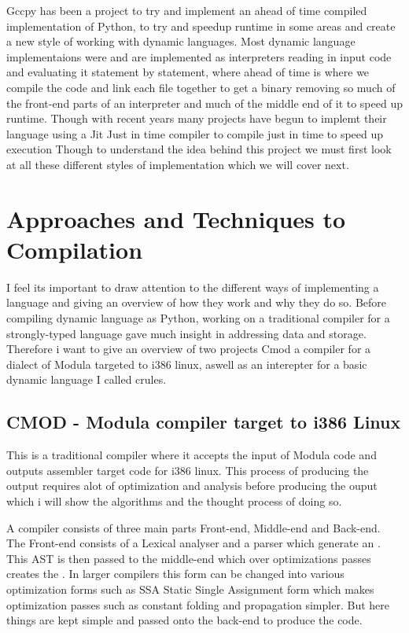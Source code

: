 \documentclass[defaultstyle,11pt]{article}
\begin{document}
Gccpy has been a project to try and implement an ahead of time compiled implementation of Python, to try and
speedup runtime in some areas and create a new style of working with dynamic languages. Most dynamic language implementaions
were and are implemented as interpreters reading in input code and evaluating it statement by statement, where ahead of time
is where we compile the code and link each file together to get a binary removing so much of the front-end parts of an interpreter
and much of the middle end of it to speed up runtime. Though with recent years many projects have begun to implemt their language
using a Jit Just in time compiler to compile just in time to speed up execution Though to understand the idea behind this project
we must first look at all these different styles of implementation which we will cover next.


\section{Approaches and Techniques to Compilation}

I feel its important to draw attention to the different ways of implementing a language and giving an overview of how they work
and why they do so. Before compiling dynamic language as Python, working on a traditional compiler for a strongly-typed language gave much
insight in addressing data and storage. Therefore i want to give an overview of two projects Cmod a compiler for a dialect of
Modula targeted to i386 linux, aswell as an interepter for a basic dynamic language I called crules.

\subsection{CMOD - Modula compiler target to i386 Linux}

This is a traditional compiler where it accepts the input of Modula code and outputs assembler target code for i386 linux. 
This process of producing the output requires alot of optimization and analysis before producing the ouput which i will
show the algorithms and the thought process of doing so.

A compiler consists of three main parts Front-end, Middle-end and Back-end. The Front-end consists of a Lexical
analyser and a parser which generate an . This AST is then passed to the
middle-end which over optimizations passes creates the . In larger
compilers this form can be changed into various optimization forms such as SSA Static Single Assignment form
which makes optimization passes such as constant folding and propagation simpler. But here things are kept simple
and passed onto the back-end to produce the code.
\end{document}
